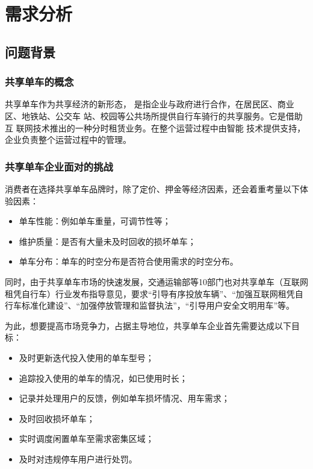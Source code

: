 \section{需求分析}\label{sec:demand}
\subsection{问题背景}
\subsubsection{共享单车的概念}
共享单车作为共享经济的新形态，
是指企业与政府进行合作，在居民区、商业区、地铁站、公交车
站、校园等公共场所提供自行车骑行的共享服务。它是借助互
联网技术推出的一种分时租赁业务。在整个运营过程中由智能
技术提供支持，企业负责整个运营过程中的管理\cite{article1}。
\subsubsection{共享单车企业面对的挑战}
消费者在选择共享单车品牌时，除了定价、押金等经济因素，还会着重考量以下体验因素：

\begin{itemize}
    \item 单车性能：例如单车重量，可调节性等；
    \item 维护质量：是否有大量未及时回收的损坏单车；
    \item 单车分布：单车的时空分布是否符合使用需求的时空分布。
\end{itemize}

同时，由于共享单车市场的快速发展，交通运输部等10部门也对共享单车（互联网租凭自行车）行业发布指导意见，要求“引导有序投放车辆”、“加强互联网租凭自行车标准化建设”、“加强停放管理和监督执法”，“引导用户安全文明用车”等。

为此，想要提高市场竞争力，占据主导地位，共享单车企业首先需要达成以下目标：

\begin{itemize}
    \item 及时更新迭代投入使用的单车型号；
    \item 追踪投入使用的单车的情况，如已使用时长；
    \item 记录并处理用户的反馈，例如单车损坏情况、用车需求；
    \item 及时回收损坏单车；
    \item 实时调度闲置单车至需求密集区域；
    \item 及时对违规停车用户进行处罚。
\end{itemize}


